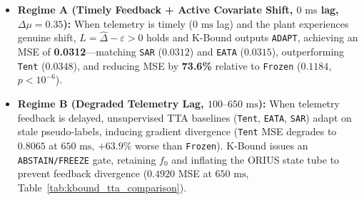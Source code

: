 \begin{itemize}
\[\begin{cases}
        \texttt{FREEZE}, & \text{if } U = \hat{\Delta} + \varepsilon < 0 \quad (\text{certified rejection of } f_a, \text{ tighten barrier}), \\
        \texttt{ABSTAIN}, & \text{if } 0 \in [L, U] \text{ or } y_t = \emptyset \quad (\text{retain } f_0, \text{ inflate } U_t(w_t), \text{ arm TV-SSK}).
      \end{cases}
    \]
    Crucially, \texttt{FREEZE} is a certified negative-benefit rejection ($U < 0$), whereas \texttt{ABSTAIN} records unresolved or missing evidence ($0 \in [L, U]$) without falsely certifying negative benefit. Under marginal coverage $\mathbb{P}(|\hat{\Delta} - \Delta_{\mathrm{cell}}| \le \varepsilon) \ge 1-\alpha$, unconditional false adaptation satisfies $\mathrm{FA}_u = \mathbb{P}(g=\texttt{ADAPT}, \Delta_{\mathrm{cell}} \le 0) \le \alpha$ and false freeze satisfies $\mathbb{P}(g=\texttt{FREEZE}, \Delta_{\mathrm{cell}} \ge 0) \le \alpha$ (transferring to population risk via the compound Hoeffding bound $\varepsilon + b(m,\delta)$ with $b(m,\delta) = \min\{2, \sqrt{2\log(2/\delta)/m}\}$).
    \item \textbf{Regime A (Timely Feedback + Active Covariate Shift, $0\text{ ms}$ lag, $\Delta \mu = 0.35$):} When telemetry is timely ($0\text{ ms}$ lag) and the plant experiences genuine shift, $L = \hat{\Delta} - \varepsilon > 0$ holds and K-Bound outputs \texttt{ADAPT}, achieving an MSE of \textbf{0.0312}---matching \texttt{SAR} ($0.0312$) and \texttt{EATA} ($0.0315$), outperforming \texttt{Tent} ($0.0348$), and reducing MSE by \textbf{73.6\%} relative to \texttt{Frozen} ($0.1184$, $p < 10^{-6}$).
    \item \textbf{Regime B (Degraded Telemetry Lag, $100\text{--}650\text{ ms}$):} When telemetry feedback is delayed, unsupervised TTA baselines (\texttt{Tent}, \texttt{EATA}, \texttt{SAR}) adapt on stale pseudo-labels, inducing gradient divergence (\texttt{Tent} MSE degrades to $0.8065$ at $650\text{ ms}$, $+63.9\%$ worse than \texttt{Frozen}). K-Bound issues an \texttt{ABSTAIN/FREEZE} gate, retaining $f_0$ and inflating the ORIUS state tube to prevent feedback divergence ($0.4920$ MSE at $650\text{ ms}$, Table~\ref{tab:kbound_tta_comparison}).
\end{itemize}

